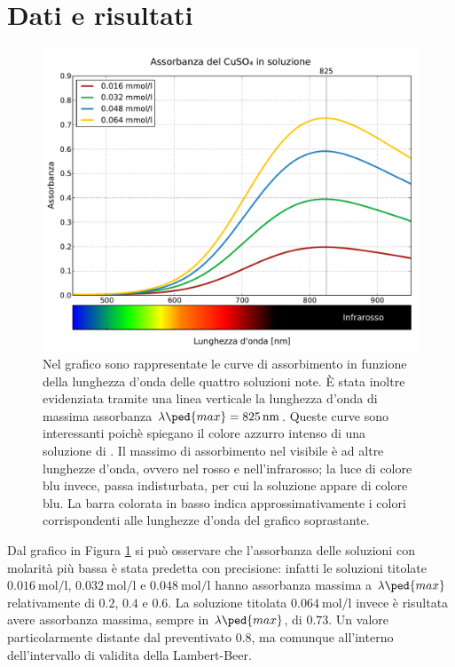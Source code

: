 \section*{Dati e risultati}

\begin{figure}
    \includegraphics[scale=0.52]{concentrazioni.pdf}
    \caption{Nel grafico sono rappresentate le curve di assorbimento in funzione della lunghezza d'onda delle quattro soluzioni note.
        \`E stata inoltre evidenziata tramite una linea verticale la lunghezza d'onda di massima assorbanza $\lambda\ped{max} = \SI{825}{\nano\meter}$.
        Queste curve sono interessanti poichè spiegano il colore azzurro intenso di una soluzione di . Il massimo di assorbimento
        nel visibile è ad altre lunghezze d'onda, ovvero nel rosso e nell'infrarosso; la luce di colore blu invece, passa indisturbata, per cui la soluzione appare di
        colore blu. La barra colorata in basso indica approssimativamente i colori corrispondenti alle lunghezze d'onda del grafico soprastante.}
    \label{fig:conc}
\end{figure}

Dal grafico in Figura \ref{fig:conc} si può osservare che l'assorbanza delle soluzioni con molarità più bassa
è stata predetta con precisione: infatti le soluzioni titolate $\SI{0.016}{\mole\per\litre}$, $\SI{0.032}{\mole\per\litre}$
e $\SI{0.048}{\mole\per\litre}$ hanno assorbanza massima a $\lambda\ped{max}$ relativamente di $0.2$, $0.4$ e $0.6$.
La soluzione titolata $\SI{0.064}{\mole\per\litre}$ invece è risultata avere assorbanza massima, sempre in $\lambda\ped{max}$,
di $0.73$. Un valore particolarmente distante dal preventivato $0.8$, ma comunque all'interno dell'intervallo di validita della Lambert-Beer.

